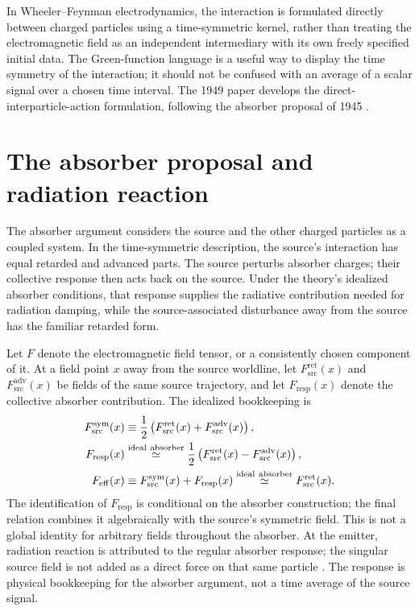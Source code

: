 \documentclass[12pt]{article}
\begin{document}
In Wheeler--Feynman electrodynamics, the interaction is formulated directly between charged particles using a time-symmetric kernel, rather than treating the electromagnetic field as an independent intermediary with its own freely specified initial data. The Green-function language is a useful way to display the time symmetry of the interaction; it should not be confused with an average of a scalar signal over a chosen time interval. The 1949 paper develops the direct-interparticle-action formulation, following the absorber proposal of 1945 \cite{WheelerFeynman1945,WheelerFeynman1949}.

\section{The absorber proposal and radiation reaction}

The absorber argument considers the source and the other charged particles as a coupled system. In the time-symmetric description, the source's interaction has equal retarded and advanced parts. The source perturbs absorber charges; their collective response then acts back on the source. Under the theory's idealized absorber conditions, that response supplies the radiative contribution needed for radiation damping, while the source-associated disturbance away from the source has the familiar retarded form.

Let $F$ denote the electromagnetic field tensor, or a consistently chosen component of it. At a field point $x$ away from the source worldline, let $F_{\mathrm{src}}^{\mathrm{ret}}(x)$ and $F_{\mathrm{src}}^{\mathrm{adv}}(x)$ be fields of the same source trajectory, and let $F_{\mathrm{resp}}(x)$ denote the collective absorber contribution. The idealized bookkeeping is
\begin{align}
  F_{\mathrm{src}}^{\mathrm{sym}}(x)
  &\equiv\frac{1}{2}\left(
  F_{\mathrm{src}}^{\mathrm{ret}}(x)
  +F_{\mathrm{src}}^{\mathrm{adv}}(x)\right),
  \notag\\
  F_{\mathrm{resp}}(x)
  &\mathrel{\mathop{\simeq}^{\mathrm{ideal\ absorber}}}
  \frac{1}{2}\left(
  F_{\mathrm{src}}^{\mathrm{ret}}(x)
  -F_{\mathrm{src}}^{\mathrm{adv}}(x)\right),
  \notag\\
  F_{\mathrm{eff}}(x)
  &\equiv F_{\mathrm{src}}^{\mathrm{sym}}(x)+F_{\mathrm{resp}}(x)
  \mathrel{\mathop{\simeq}^{\mathrm{ideal\ absorber}}}
  F_{\mathrm{src}}^{\mathrm{ret}}(x).
  \label{eq:absorber-schematic}
\end{align}
The identification of $F_{\mathrm{resp}}$ is conditional on the absorber construction; the final relation combines it algebraically with the source's symmetric field. This is not a global identity for arbitrary fields throughout the absorber. At the emitter, radiation reaction is attributed to the regular absorber response; the singular source field is not added as a direct force on that same particle \cite{WheelerFeynman1945,WheelerFeynman1949}. The response is physical bookkeeping for the absorber argument, not a time average of the source signal.
\end{document}
